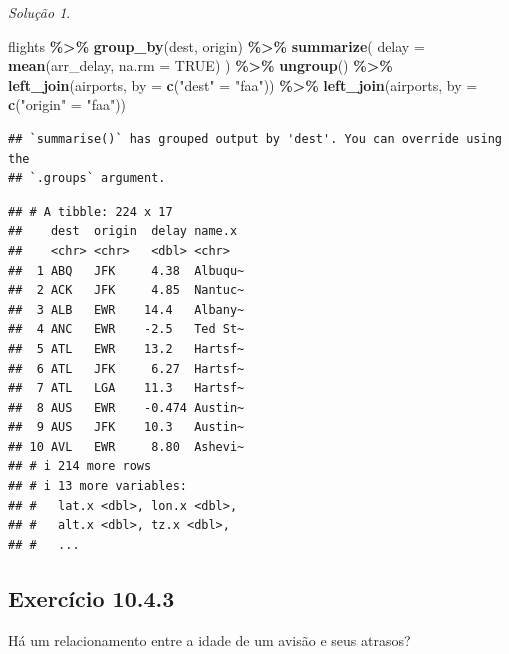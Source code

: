 \documentclass[
]{latex/krantz}
\newenvironment{Shaded}{\begin{snugshade}}{\end{snugshade}}
\newcommand{\AttributeTok}[1]{\textcolor[rgb]{0.13,0.29,0.53}{#1}}
\newcommand{\ConstantTok}[1]{\textcolor[rgb]{0.56,0.35,0.01}{#1}}
\newcommand{\FunctionTok}[1]{\textcolor[rgb]{0.13,0.29,0.53}{\textbf{#1}}}
\newcommand{\NormalTok}[1]{#1}
\newcommand{\OtherTok}[1]{\textcolor[rgb]{0.56,0.35,0.01}{#1}}
\newcommand{\SpecialCharTok}[1]{\textcolor[rgb]{0.81,0.36,0.00}{\textbf{#1}}}
\newcommand{\StringTok}[1]{\textcolor[rgb]{0.31,0.60,0.02}{#1}}
\theoremstyle{definition}
\theoremstyle{definition}
\theoremstyle{definition}
\theoremstyle{definition}
\theoremstyle{remark}
\newtheorem*{solution}{Solução}
\begin{document}
\begin{solution}
\leavevmode

\begin{Shaded}
\begin{Highlighting}[]
\NormalTok{flights }\SpecialCharTok{\%\textgreater{}\%}
  \FunctionTok{group\_by}\NormalTok{(dest, origin) }\SpecialCharTok{\%\textgreater{}\%}
  \FunctionTok{summarize}\NormalTok{(}
    \AttributeTok{delay =} \FunctionTok{mean}\NormalTok{(arr\_delay, }\AttributeTok{na.rm =} \ConstantTok{TRUE}\NormalTok{)}
\NormalTok{  ) }\SpecialCharTok{\%\textgreater{}\%}
  \FunctionTok{ungroup}\NormalTok{() }\SpecialCharTok{\%\textgreater{}\%}
  \FunctionTok{left\_join}\NormalTok{(airports, }\AttributeTok{by =} \FunctionTok{c}\NormalTok{(}\StringTok{"dest"} \OtherTok{=} \StringTok{"faa"}\NormalTok{)) }\SpecialCharTok{\%\textgreater{}\%}
  \FunctionTok{left\_join}\NormalTok{(airports, }\AttributeTok{by =} \FunctionTok{c}\NormalTok{(}\StringTok{"origin"} \OtherTok{=} \StringTok{"faa"}\NormalTok{))}
\end{Highlighting}
\end{Shaded}

\begin{verbatim}
## `summarise()` has grouped output by 'dest'. You can override using the
## `.groups` argument.
\end{verbatim}

\begin{verbatim}
## # A tibble: 224 x 17
##    dest  origin  delay name.x 
##    <chr> <chr>   <dbl> <chr>  
##  1 ABQ   JFK     4.38  Albuqu~
##  2 ACK   JFK     4.85  Nantuc~
##  3 ALB   EWR    14.4   Albany~
##  4 ANC   EWR    -2.5   Ted St~
##  5 ATL   EWR    13.2   Hartsf~
##  6 ATL   JFK     6.27  Hartsf~
##  7 ATL   LGA    11.3   Hartsf~
##  8 AUS   EWR    -0.474 Austin~
##  9 AUS   JFK    10.3   Austin~
## 10 AVL   EWR     8.80  Ashevi~
## # i 214 more rows
## # i 13 more variables:
## #   lat.x <dbl>, lon.x <dbl>,
## #   alt.x <dbl>, tz.x <dbl>,
## #   ...
\end{verbatim}

\end{solution}

\hypertarget{exr10-4-3}{%
\subsection*{Exercício 10.4.3}\label{exr10-4-3}}

Há um relacionamento entre a idade de um avisão e seus atrasos?
\end{document}
